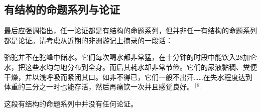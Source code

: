 \subsection{有结构的命题系列与论证}

最后应强调指出，任一论证都是有结构的命题系列，但并非任一有结构的命题系列都是论证。请考虑从近期的非洲游记上摘录的一段话：

\begin{displayquote}
骆驼并不在驼峰中储水。它们每次喝水都非常猛，在十分钟的时段中能饮入28加仑水，把这些水均匀地分布到全身。而后其耗水却非常节俭。它们的尿液黏稠、粪便干燥，并以浅呼吸而紧闭其口。如非不得已，它们一般不出汗……在失水程度达到体重的三分之一时也能存活，然后再痛饮一次并且感觉良好。${}^{[8]}$
\end{displayquote}

这段有结构的命题系列中并没有任何论证。

\begin{center}
\end{center} 